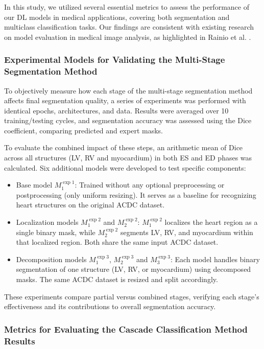 \documentclass[fleqn,10pt]{wlscirep}
\begin{document}
In this study, we utilized several essential metrics to assess the performance of our DL models in medical applications, covering both segmentation and multiclass classification tasks. Our findings are consistent with existing research on model evaluation in medical image analysis, as highlighted in Rainio et al. \cite{Rainio:2024}.

\subsubsection*{Experimental Models for Validating the Multi-Stage Segmentation Method}

To objectively measure how each stage of the multi-stage segmentation method affects final segmentation quality, a series of experiments was performed with identical epochs, architectures, and data. Results were averaged over 10 training/testing cycles, and segmentation accuracy was assessed using the Dice coefficient, comparing predicted and expert masks.

To evaluate the combined impact of these steps, an arithmetic mean of Dice across all structures (LV, RV and myocardium) in both ES and ED phases was calculated. Six additional models were developed to test specific components:

\begin{itemize}
    \item Base model \(M_1^{\exp 1}\): Trained without any optional preprocessing or postprocessing (only uniform resizing). It serves as a baseline for recognizing heart structures on the original ACDC dataset.
    \item Localization models \(M_1^{\exp 2}\) and \(M_2^{\exp 2}\): \(M_1^{\exp 2}\) localizes the heart region as a single binary mask, while \(M_2^{\exp 2}\) segments LV, RV, and myocardium within that localized region. Both share the same input ACDC dataset.
    \item Decomposition models \(M_1^{\exp 3}\), \(M_2^{\exp 3}\) and \(M_3^{\exp 3}\): Each model handles binary segmentation of one structure (LV, RV, or myocardium) using decomposed masks. The same ACDC dataset is resized and split accordingly.
\end{itemize}

These experiments compare partial versus combined stages, verifying each stage’s effectiveness and its contributions to overall segmentation accuracy.

\subsubsection*{Metrics for Evaluating the Cascade Classification Method Results}
\end{document}

